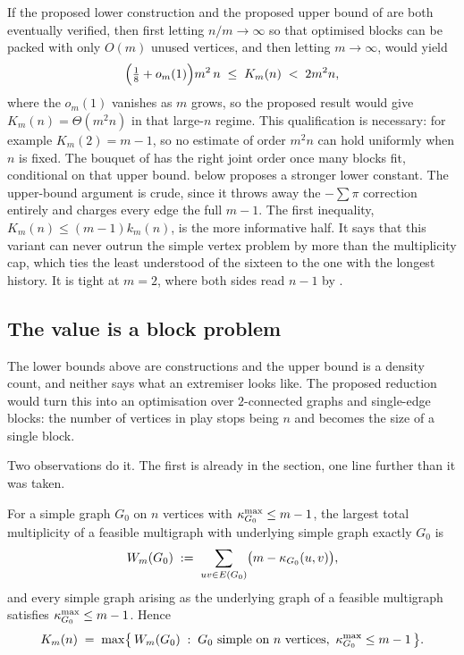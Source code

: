 If the proposed lower construction and the proposed upper bound of
 are both eventually verified, then first letting $n/m\to\infty$ so that optimised blocks
can be packed with only $O(m)$ unused vertices, and then letting $m\to\infty$,
would yield
\[
    \Bigl(\tfrac{1}{8} + o_m(1)\Bigr) m^2 \, n
    \;\le\; K_m(n) \;<\; 2 m^2 n ,
\]
where the $o_m(1)$ vanishes as $m$ grows,
so the proposed result would give $K_m(n) = \Theta(m^2 n)$ in that large-$n$
regime. This qualification is necessary: for example $K_m(2)=m-1$, so no
estimate of order $m^2n$ can hold uniformly when $n$ is fixed. The bouquet of
 has the right joint order once many blocks fit,
conditional on that upper bound.  below
proposes a stronger lower constant. The upper-bound argument is crude, since
it throws away the $-\sum \pi$ correction entirely and charges every edge the
full $m-1$. The first inequality, $K_m(n) \le (m-1)k_m(n)$, is the more
informative half. It says that this variant can never outrun the simple vertex
problem by more than the multiplicity cap, which ties the least understood of
the sixteen to the one with the longest history. It is tight at $m = 2$, where
both sides read $n-1$ by .

\subsection{The value is a block problem}\label{sec:multi-vertex-blocks}

The lower bounds above are constructions and the upper bound is a density count, and neither says what an extremiser looks like. The proposed reduction would turn this into an optimisation over $2$-connected graphs and single-edge blocks: the number of vertices in play stops being $n$ and becomes the size of a single block.

Two observations do it. The first is already in the section, one line further than it was taken.

\begin{conjecture}\label{lem:multi-vertex-objective}
For a simple graph $G_0$ on $n$ vertices with $\kappa^{\max}_{G_0} \le m-1$, the largest total multiplicity of a feasible multigraph with underlying simple graph exactly $G_0$ is
\[
    W_m(G_0) \;:=\; \sum_{uv \in E(G_0)} \bigl(m - \kappa_{G_0}(u,v)\bigr) ,
\]
and every simple graph arising as the underlying graph of a feasible multigraph satisfies $\kappa^{\max}_{G_0} \le m-1$. Hence
\[
    K_m(n) \;=\; \max\bigl\{\, W_m(G_0) \;:\; G_0 \text{ simple on } n \text{ vertices},\ \kappa^{\max}_{G_0} \le m-1 \,\bigr\} .
\]
\end{conjecture}

